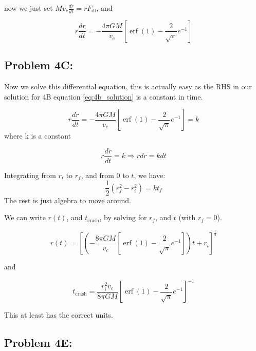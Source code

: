 now we just set $Mv_c\frac{dr}{dt} = rF_{\mathrm{df}}$, and 

\begin{equation}\label{eq:4b_solution}
    \boxed{r\frac{dr}{dt} = -\frac{4\pi GM}{v_c}[\operatorname{erf}(1) - \frac{2}  {\sqrt{\pi}}e^{-1}]}
\end{equation}

\subsection{Problem 4C:}
Now we solve this differential equation, this is actually easy as the RHS in our solution for 4B equation \ref{eq:4b_solution} is a constant in time. 


\begin{equation}
    r\frac{dr}{dt} = -\frac{4\pi GM}{v_c}[\operatorname{erf}(1) - \frac{2}  {\sqrt{\pi}}e^{-1}] = k
\end{equation}
where k is a constant 

\begin{equation}
    r\frac{dr}{dt}  = k \Rightarrow rdr = kdt
\end{equation}

Integrating from $r_i$ to $r_f$, and from $0$ to $t$, we have:
\begin{equation}
    \frac{1}{2} (r_f^2 - r_i^2) = kt_f
\end{equation}
The rest is just algebra to move around.

We can write $r(t)$, and $t_{\mathrm{crash}}$, by solving for $r_f$, and $t$ (with $r_f =0$). 

\begin{equation}
    r(t) = [(-\frac{8\pi GM}{v_c}[\operatorname{erf}(1) - \frac{2}  {\sqrt{\pi}}e^{-1}])t + r_i]^{\frac{1}{2}}
\end{equation}

and 

\begin{equation}
    \boxed{t_{\mathrm{crash}} = \frac{r_i^2v_c}{8\pi G M}[\operatorname{erf}(1) - \frac{2}  {\sqrt{\pi}}e^{-1}]^{-1}}
\end{equation}

This at least has the correct units. 

\subsection*{Problem 4E:}














